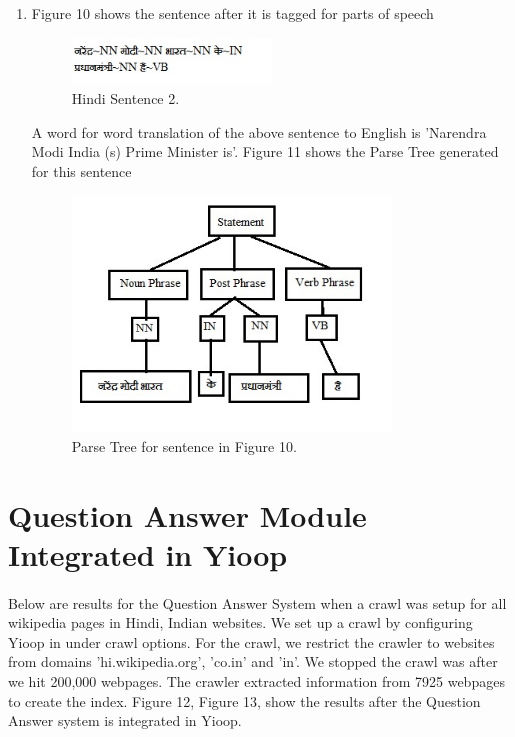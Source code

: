 \begin{enumerate}
\break
\item  Figure 10 shows the sentence after it is tagged for parts of speech

\begin{figure}[htb]
\centering
\includegraphics[width=0.5\textwidth]{images/sentence_testcase2.jpg}
\caption{Hindi Sentence 2.} 
\label{fig:sentence_testcase2}
\end{figure}

A word for word translation of the above sentence to English is 'Narendra Modi India (s) Prime Minister is'. Figure 11 shows the Parse Tree generated for this sentence 

\begin{figure}[htb]
\centering
\includegraphics[width=0.8\textwidth]{images/standalone_testcase2.jpg}
\caption{Parse Tree for sentence in Figure 10.} 
\label{fig:standalone_testcase2}
\end{figure}

\end{enumerate}

\break
\section{Question Answer Module Integrated in Yioop}
\paragraph{}
Below are results for the Question Answer System when a crawl was setup for all wikipedia pages in Hindi, Indian websites. We set up a crawl by configuring Yioop in under crawl options. For the crawl, we restrict the crawler to websites from domains 'hi.wikipedia.org', 'co.in' and 'in'. We stopped the crawl was after we hit 200,000 webpages. The crawler extracted information from 7925 webpages to create the index. Figure 12, Figure 13, show the results after the Question Answer system is integrated in Yioop. 

